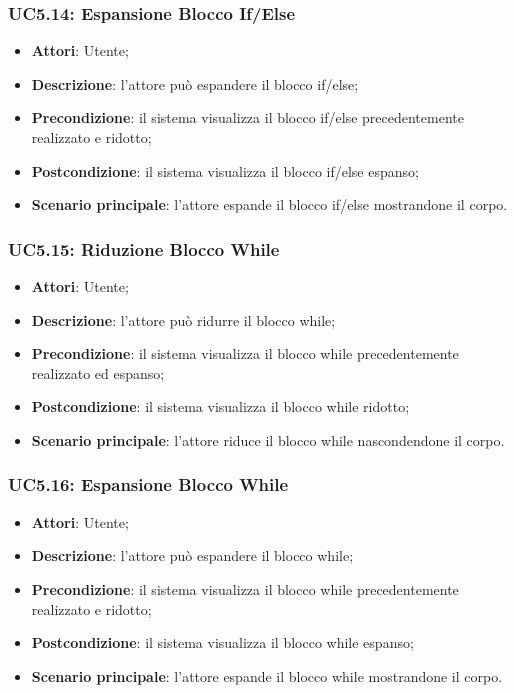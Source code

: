 \begin{itemize}
\begin{itemize}
\begin{itemize}
\begin{itemize}
\subsubsection{UC5.14: Espansione Blocco If/Else}
\label{UC5.14}
\begin{itemize}
	\item \textbf{Attori}: Utente;
	\item \textbf{Descrizione}: l'attore può espandere il blocco if/else;
	\item \textbf{Precondizione}: il sistema visualizza il blocco if/else precedentemente realizzato e ridotto;
	\item \textbf{Postcondizione}: il sistema visualizza il blocco if/else espanso;
	\item \textbf{Scenario principale}: l'attore espande il blocco if/else mostrandone il corpo.
\end{itemize}

\subsubsection{UC5.15: Riduzione Blocco While}
\label{UC5.15}
\begin{itemize}
	\item \textbf{Attori}: Utente;
	\item \textbf{Descrizione}: l'attore può ridurre il blocco while;
	\item \textbf{Precondizione}: il sistema visualizza il blocco while precedentemente realizzato ed espanso;
	\item \textbf{Postcondizione}: il sistema visualizza il blocco while ridotto;
	\item \textbf{Scenario principale}: l'attore riduce il blocco while nascondendone il corpo.
\end{itemize}

\subsubsection{UC5.16: Espansione Blocco While}
\label{UC5.16}
\begin{itemize}
	\item \textbf{Attori}: Utente;
	\item \textbf{Descrizione}: l'attore può espandere il blocco while;
	\item \textbf{Precondizione}: il sistema visualizza il blocco while precedentemente realizzato e ridotto;
	\item \textbf{Postcondizione}: il sistema visualizza il blocco while espanso;
	\item \textbf{Scenario principale}: l'attore espande il blocco while mostrandone il corpo.
\end{itemize}


\end{itemize}
\end{itemize}
\end{itemize}
\end{itemize}
